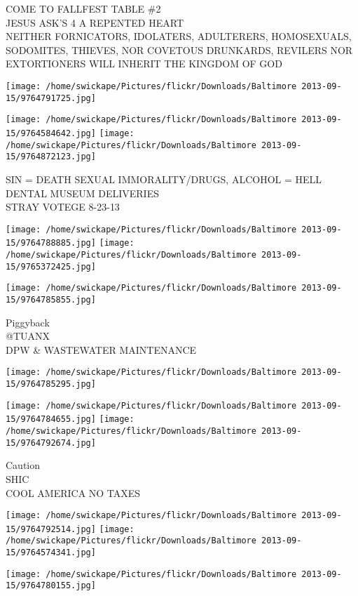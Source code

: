 \documentclass[10pt,letterpaper]{article}
\begin{document}
COME TO FALLFEST TABLE \#2\\
JESUS ASK'S 4 A REPENTED HEART\\
NEITHER FORNICATORS, IDOLATERS, ADULTERERS, HOMOSEXUALS, SODOMITES, THIEVES, NOR COVETOUS DRUNKARDS, REVILERS NOR EXTORTIONERS WILL INHERIT THE KINGDOM OF GOD
\pagebreak

\texttt{[image: /home/swickape/Pictures/flickr/Downloads/Baltimore 2013-09-15/9764791725.jpg]}

\vspace{0.25in}
\texttt{[image: /home/swickape/Pictures/flickr/Downloads/Baltimore 2013-09-15/9764584642.jpg]}
\texttt{[image: /home/swickape/Pictures/flickr/Downloads/Baltimore 2013-09-15/9764872123.jpg]}

SIN = DEATH SEXUAL IMMORALITY/DRUGS, ALCOHOL = HELL\\
DENTAL MUSEUM DELIVERIES\\
STRAY VOTEGE 8{-}23{-}13
\pagebreak

\texttt{[image: /home/swickape/Pictures/flickr/Downloads/Baltimore 2013-09-15/9764788885.jpg]}
\texttt{[image: /home/swickape/Pictures/flickr/Downloads/Baltimore 2013-09-15/9765372425.jpg]}

\texttt{[image: /home/swickape/Pictures/flickr/Downloads/Baltimore 2013-09-15/9764785855.jpg]}

Piggyback\\
@TUANX\\
DPW \& WASTEWATER MAINTENANCE
\pagebreak

\texttt{[image: /home/swickape/Pictures/flickr/Downloads/Baltimore 2013-09-15/9764785295.jpg]}

\vspace{0.25in}
\texttt{[image: /home/swickape/Pictures/flickr/Downloads/Baltimore 2013-09-15/9764784655.jpg]}
\texttt{[image: /home/swickape/Pictures/flickr/Downloads/Baltimore 2013-09-15/9764792674.jpg]}

Caution\\
SHIC\\
COOL AMERICA NO TAXES
\pagebreak

\texttt{[image: /home/swickape/Pictures/flickr/Downloads/Baltimore 2013-09-15/9764792514.jpg]}
\texttt{[image: /home/swickape/Pictures/flickr/Downloads/Baltimore 2013-09-15/9764574341.jpg]}

\texttt{[image: /home/swickape/Pictures/flickr/Downloads/Baltimore 2013-09-15/9764780155.jpg]}
\end{document}
